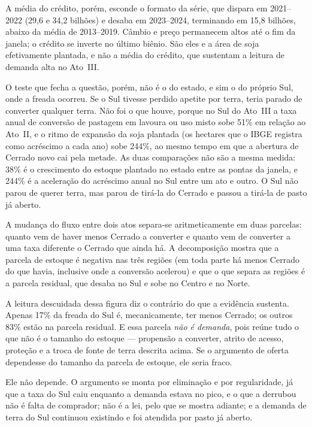 A média do crédito, porém, esconde o formato da série, que dispara em
2021--2022 (29,6 e 34,2 bilhões) e desaba em 2023--2024, terminando em
15,8 bilhões, abaixo da média de 2013--2019. Câmbio e preço permanecem altos
até o fim da janela; o crédito se inverte no último biênio. São eles e a área
de soja efetivamente plantada, e não a média do crédito, que sustentam a
leitura de demanda alta no Ato~III.

O teste que fecha a questão, porém, não é o do estado, e sim o do próprio Sul,
onde a freada ocorreu. Se o Sul tivesse perdido apetite por terra, teria
parado de converter qualquer terra. Não foi o que houve, porque no Sul do Ato~III a
taxa anual de conversão de pastagem em lavoura ou uso misto sobe 51\% em
relação ao Ato~II, e o ritmo de expansão da soja plantada (os hectares que o
IBGE registra como acréscimo a cada ano) sobe 244\%, ao mesmo tempo em que a
abertura de Cerrado novo cai pela metade. As duas comparações não são a mesma
medida: 38\% é o crescimento do estoque plantado no estado entre as pontas da
janela, e 244\% é a aceleração do acréscimo anual no Sul entre um ato e outro.
O Sul não parou de querer terra, mas parou de tirá-la do Cerrado e passou a
tirá-la de pasto já aberto.

A mudança do fluxo entre dois atos separa-se aritmeticamente em duas
parcelas: quanto vem de haver menos Cerrado a converter e quanto vem de
converter a uma taxa diferente o Cerrado que ainda há. A decomposição mostra
que a parcela de estoque é negativa nas três regiões (em toda parte há
menos Cerrado do que havia, inclusive onde a conversão acelerou) e que o
que separa as regiões é a parcela residual, que desaba no Sul e sobe no
Centro e no Norte.

A leitura descuidada dessa figura diz o contrário do que a evidência sustenta.
Apenas 17\% da freada do Sul é, mecanicamente, ter menos Cerrado; os outros
83\% estão na parcela residual. E essa parcela \emph{não é demanda}, pois reúne tudo o que não é o
tamanho do estoque --- propensão a converter, atrito de acesso, proteção e a
troca de fonte de terra descrita acima. Se o argumento de oferta dependesse do
tamanho da parcela de estoque, ele seria fraco.

Ele não depende. O argumento se monta por eliminação e por regularidade, já que a
taxa do Sul caiu enquanto a demanda estava no pico, e o que a derrubou não é
falta de comprador; não é a lei, pelo que se mostra adiante; e a demanda de
terra do Sul continuou existindo e foi atendida por pasto já aberto.

